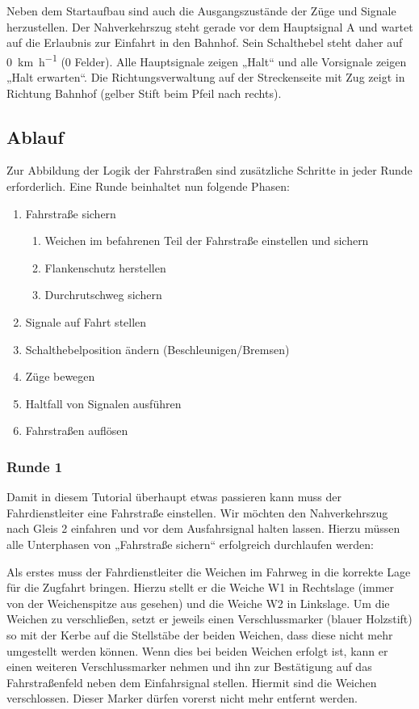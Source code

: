 \setup

  Neben dem Startaufbau sind auch die Ausgangszustände der Züge und Signale herzustellen. Der Nahverkehrszug steht gerade vor dem Hauptsignal A und wartet auf die Erlaubnis zur Einfahrt in den Bahnhof. Sein Schalthebel steht daher auf \SI{0}{\kilo\metre\per\hour} (0 Felder). Alle Hauptsignale zeigen „Halt“ und alle Vorsignale zeigen „Halt erwarten“. Die Richtungsverwaltung auf der Streckenseite mit Zug zeigt in Richtung Bahnhof (gelber Stift beim Pfeil nach rechts).

\subsection*{Ablauf}
  Zur Abbildung der Logik der Fahrstraßen sind zusätzliche Schritte in jeder Runde erforderlich. Eine Runde beinhaltet nun folgende Phasen:
  \begin{enumerate}
    \item Fahrstraße sichern
      \begin{enumerate}[label=\alph*)]
        \item Weichen im befahrenen Teil der Fahrstraße einstellen und sichern
        \item Flankenschutz herstellen
        \item Durchrutschweg sichern
      \end{enumerate}
    \item Signale auf Fahrt stellen
    \item Schalthebelposition ändern (Beschleunigen/Bremsen)
    \item Züge bewegen
    \item Haltfall von Signalen ausführen
    \item Fahrstraßen auflösen
  \end{enumerate}

\subsubsection*{Runde 1}
  Damit in diesem Tutorial überhaupt etwas passieren kann muss der Fahrdienstleiter eine Fahrstraße einstellen. Wir möchten den Nahverkehrszug nach Gleis 2 einfahren und vor dem Ausfahrsignal halten lassen. Hierzu müssen alle Unterphasen von „Fahrstraße sichern“ erfolgreich durchlaufen werden:

   Als erstes muss der Fahrdienstleiter die Weichen im Fahrweg in die korrekte Lage für die Zugfahrt bringen. Hierzu stellt er die Weiche W1 in Rechtslage (immer von der Weichenspitze aus gesehen) und die Weiche W2 in Linkslage. Um die Weichen zu verschließen, setzt er jeweils einen Verschlussmarker (blauer Holzstift) so mit der Kerbe auf die Stellstäbe der beiden Weichen, dass diese nicht mehr umgestellt werden können. Wenn dies bei beiden Weichen erfolgt ist, kann er einen weiteren Verschlussmarker nehmen und ihn zur Bestätigung auf das Fahrstraßenfeld neben dem Einfahrsignal stellen. Hiermit sind die Weichen verschlossen. Dieser Marker dürfen vorerst nicht mehr entfernt werden.

